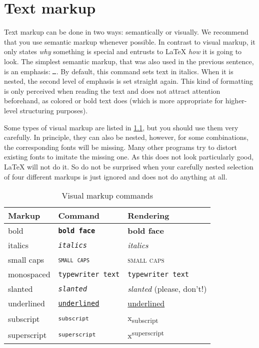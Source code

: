 \chapter{Text markup}

Text markup can be done in two ways: semantically or visually.
We recommend that you use semantic markup whenever possible.
In contrast to visual markup, it only states \emph{why} something is special and entrusts to \LaTeX{} \emph{how} it is going to look.
The simplest semantic markup, that was also used in the previous sentence, is an emphasis: \texttt{\emph{…}}.
By default, this command sets text in italics.
When it is nested, the second level of emphasis is set straight again.
This kind of formatting is only perceived when reading the text and does not attract attention beforehand, as colored or bold text does (which is more appropriate for higher-level structuring purposes).

Some types of visual markup are listed in \cref{tbl:visual-markup}, but you should use them very carefully.
In principle, they can also be nested, however, for some combinations, the corresponding fonts will be missing.
Many other programs try to distort existing fonts to imitate the missing one.
As this does not look particularly good, \LaTeX{} will not do it.
So do not be surprised when your carefully nested selection of four different markups is just ignored and does not do anything at all.

\begin{table}[H]
	\center
	\begin{tabular}{lll}
		\toprule
		Markup & Command & Rendering \\
		\midrule
		bold & \texttt{\textbf{bold face}} & \textbf{bold face} \\
		italics & \texttt{\textit{italics}} & \textit{italics} \\
		small caps & \texttt{\textsc{small caps}} & \textsc{small caps} \\
		monospaced & \texttt{\texttt{typewriter text}} & \texttt{typewriter text} \\
		slanted & \texttt{\textsl{slanted}} & \textsl{slanted} (please, don’t!) \\
		underlined & \texttt{\underline{underlined}} & \underline{underlined} \\
		subscript & \texttt{\textsubscript{subscript}} & x\textsubscript{subscript} \\
		superscript & \texttt{\textsubscript{superscript}} & x\textsuperscript{superscript} \\
		\bottomrule
	\end{tabular}
	\caption{Visual markup commands}
	\label{tbl:visual-markup}
\end{table}

